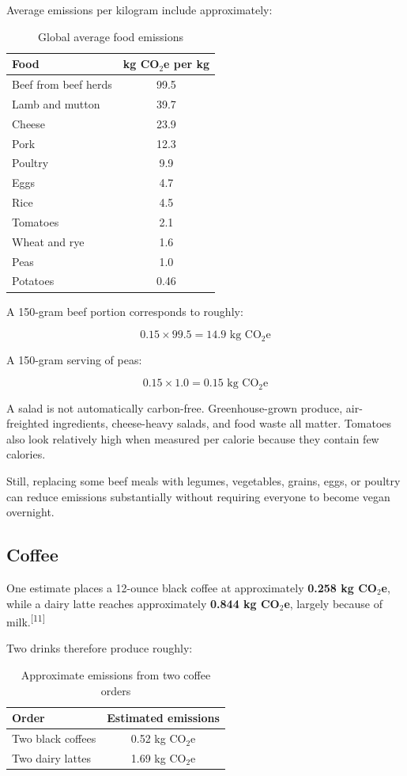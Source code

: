 \documentclass{article}
\begin{document}
Average emissions per kilogram include approximately:

\begin{table}[h]
\centering
\begin{tabular}{lc}
\toprule
\textbf{Food} & \textbf{kg CO$_2$e per kg} \\
\midrule
Beef from beef herds & 99.5 \\
Lamb and mutton & 39.7 \\
Cheese & 23.9 \\
Pork & 12.3 \\
Poultry & 9.9 \\
Eggs & 4.7 \\
Rice & 4.5 \\
Tomatoes & 2.1 \\
Wheat and rye & 1.6 \\
Peas & 1.0 \\
Potatoes & 0.46 \\
\bottomrule
\end{tabular}
\caption{Global average food emissions}
\end{table}

A 150-gram beef portion corresponds to roughly:

\[
0.15 \times 99.5
=
14.9\text{ kg CO$_2$e}
\]

A 150-gram serving of peas:

\[
0.15 \times 1.0
=
0.15\text{ kg CO$_2$e}
\]

A salad is not automatically carbon-free. Greenhouse-grown produce, air-freighted ingredients, cheese-heavy salads, and food waste all matter. Tomatoes also look relatively high when measured per calorie because they contain few calories.

Still, replacing some beef meals with legumes, vegetables, grains, eggs, or poultry can reduce emissions substantially without requiring everyone to become vegan overnight.

\subsection*{Coffee}

One estimate places a 12-ounce black coffee at approximately \textbf{0.258 kg CO$_2$e}, while a dairy latte reaches approximately \textbf{0.844 kg CO$_2$e}, largely because of milk.\textsuperscript{[11]}

Two drinks therefore produce roughly:

\begin{table}[h]
\centering
\begin{tabular}{lc}
\toprule
\textbf{Order} & \textbf{Estimated emissions} \\
\midrule
Two black coffees & 0.52 kg CO$_2$e \\
Two dairy lattes & 1.69 kg CO$_2$e \\
\bottomrule
\end{tabular}
\caption{Approximate emissions from two coffee orders}
\end{table}
\end{document}
